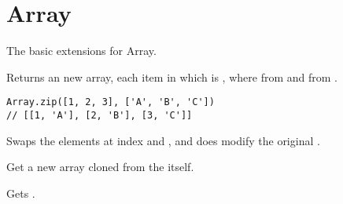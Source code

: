\section{Array}
The basic extensions for Array.

Returns an new array, each item in which is \cd{[x, y]}, where  from  and  from .

\begin{lstlisting}
Array.zip([1, 2, 3], ['A', 'B', 'C'])
// [[1, 'A'], [2, 'B'], [3, 'C']]
\end{lstlisting}

Swaps the elements at index  and , and does modify the original .

Get a new array cloned from the  itself.

Gets .

